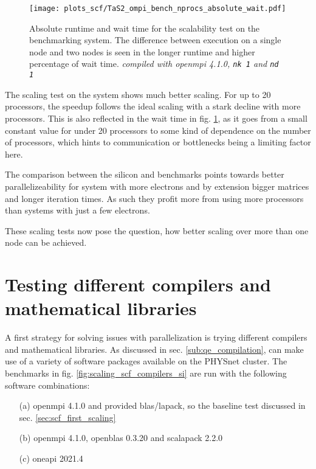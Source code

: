 \documentclass[main.tex]{subfiles}
\begin{document}
\begin{figure}[b!]
\centering
\texttt{[image: plots\_scf/TaS2\_ompi\_bench\_nprocs\_absolute\_wait.pdf]}
\caption{Absolute runtime and wait time for the scalability test on the \TaS benchmarking system. The difference between execution on a single node and two nodes is seen in the longer runtime and higher percentage of wait time. \emph{ compiled with \gls{openmpi} 4.1.0, \texttt{nk 1} and \texttt{nd 1}}}
\label{fig:scaling_scf_ompi_nprocs_tas2_absolute_wait}
\end{figure}
The scaling test on the \TaS system shows much better scaling.
For up to 20 processors, the speedup follows the ideal scaling with a stark decline with more processors.
This is also reflected in the wait time in fig. \ref{fig:scaling_scf_ompi_nprocs_tas2_absolute_wait}, as it goes from a small constant value for under 20 processors to some kind of dependence on the number of processors, which hints to communication or bottlenecks being a limiting factor here.

The comparison between the silicon and \TaS benchmarks points towards better parallelizeability for system with more electrons and by extension bigger matrices and longer iteration times.
As such they profit more from using more processors than systems with just a few electrons.

These scaling tests now pose the question, how better scaling over more than one node can be achieved.

\section{Testing different compilers and mathematical libraries}\label{sec:scf_scaling_compilers}

A first strategy for solving issues with parallelization is trying different compilers and mathematical libraries.
As discussed in sec. \ref{sub:qe_compilation}, \QE can make use of a variety of software packages available on the PHYSnet cluster.
The benchmarks in fig. \ref{fig:scaling_scf_compilers_si} are run with the following software combinations:
\begin{itemize}
    \item[(a)] \gls{openmpi} 4.1.0 and \QE provided \gls{blas}/\gls{lapack}, so the baseline test discussed in sec. \ref{sec:scf_first_scaling}
    \item[(b)] \gls{openmpi} 4.1.0, \gls{openblas} 0.3.20 and \gls{scalapack} 2.2.0
    \item[(c)] \gls{oneapi} 2021.4
\end{itemize}
\end{document}
